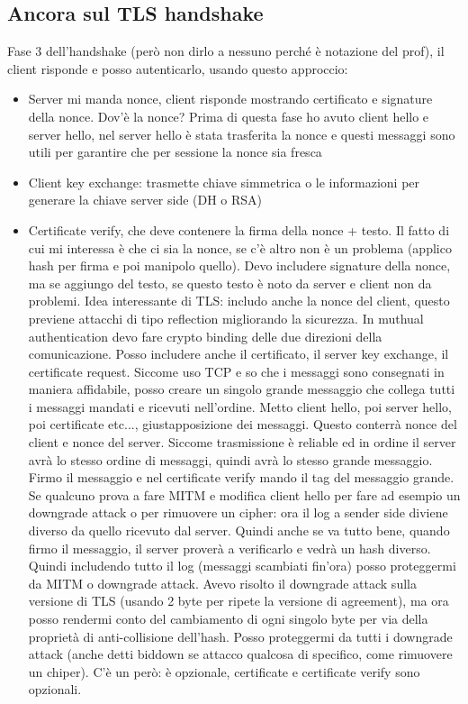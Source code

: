 \documentclass[16px]{article}
\begin{document}
\subsection{Ancora sul TLS handshake}
Fase 3 dell'handshake (però non dirlo a nessuno perché è notazione del prof), il client risponde e posso autenticarlo, usando questo approccio:
\begin{itemize}
\item Server mi manda nonce, client risponde mostrando certificato e signature della nonce. Dov'è la nonce? Prima di questa fase ho avuto client hello e server hello, nel server hello è stata trasferita la nonce e questi messaggi sono utili per garantire che per sessione la nonce sia fresca
\item Client key exchange: trasmette chiave simmetrica o le informazioni per generare la chiave server side (DH o RSA)
\item Certificate verify, che deve contenere la firma della nonce + testo. Il fatto di cui mi interessa è che ci sia la nonce, se c'è altro non è un problema (applico hash per firma e poi manipolo quello). Devo includere signature della nonce, ma se aggiungo del testo, se questo testo è noto da server e client non da problemi. Idea interessante di TLS: includo anche la nonce del client, questo previene attacchi di tipo reflection migliorando la sicurezza. In muthual authentication devo fare crypto binding delle due direzioni della comunicazione. Posso includere anche il certificato, il server key exchange, il certificate request. Siccome uso TCP e so che i messaggi sono consegnati in maniera affidabile, posso creare un singolo grande messaggio che collega tutti i messaggi mandati e ricevuti nell'ordine. Metto client hello, poi server hello, poi certificate etc..., giustapposizione dei messaggi. Questo conterrà nonce del client e nonce del server. Siccome trasmissione è reliable ed in ordine il server avrà lo stesso ordine di messaggi, quindi avrà lo stesso grande messaggio. Firmo il messaggio e nel certificate verify mando il tag del messaggio grande.\\ Se qualcuno prova a fare MITM e modifica client hello per fare ad esempio un downgrade attack o per rimuovere un cipher: ora il log a sender side diviene diverso da quello ricevuto dal server. Quindi anche se va tutto bene, quando firmo il messaggio, il server proverà a verificarlo e vedrà un hash diverso. Quindi includendo tutto il log (messaggi scambiati fin'ora) posso proteggermi da MITM o downgrade attack. Avevo risolto il downgrade attack sulla versione di TLS (usando 2 byte per ripete la versione di agreement), ma ora posso rendermi conto del cambiamento di ogni singolo byte per via della proprietà di anti-collisione dell'hash. Posso proteggermi da tutti i downgrade attack (anche detti biddown se attacco qualcosa di specifico, come rimuovere un chiper). C'è un però: è opzionale, certificate e certificate verify sono opzionali.
\end{itemize}
\end{document}
